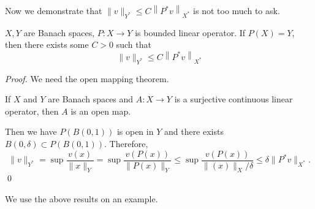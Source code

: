 Now we demonstrate that $\|v\|_{Y^{*}} \leq C\left\|P^{*} v\right\|_{X^{*}}$ is not too much to ask.

\begin{theorem}
     $X, Y$ are Banach spaces, $P: X \rightarrow Y$ is bounded linear operator. If $P(X)=Y$, then there exists some $C>0$ such that
    $$
    \|v\|_{Y^{*}} \leq C\left\|P^{*} v\right\|_{X^{*}}
    $$
\end{theorem}
\begin{proof}
We need the open mapping theorem. 

\begin{theorem}
If $X$ and $Y$ are Banach spaces and $A:X\to Y$ is a surjective continuous linear operator, then $A$ is an open map.
\end{theorem}

\vspace{1em}
Then we have $P(B(0,1))$ is open in $Y$ and there exists $B(0,\delta)\subset  P(B(0,1))$. Therefore, 
\[
    \|v\|_{Y^*} = \sup \frac{v(x)}{\|x\|_Y} = \sup \frac{v(P(x))}{\|P(x)\|_Y}\le \sup \frac{v(P(x))}{\|(x)\|_X/\delta} \le  \delta \|P^*v\|_{X^*}. 
\]
\qed
\end{proof}

We use the above results on an example. 

